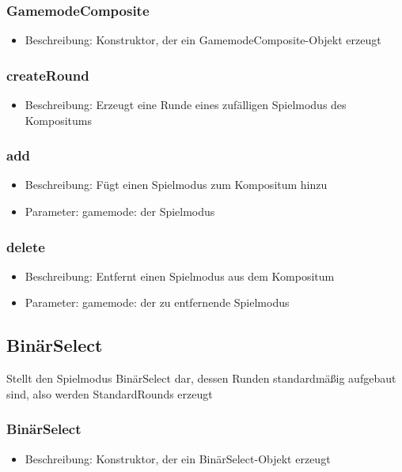 \documentclass[a4paper]{scrreprt}
\begin{document}
    \subsubsection{GamemodeComposite}
    \begin{itemize}
        \item Beschreibung: Konstruktor, der ein GamemodeComposite-Objekt erzeugt
    \end{itemize}
    \subsubsection{createRound}
    \begin{itemize}
        \item Beschreibung: Erzeugt eine Runde eines zufälligen Spielmodus des Kompositums
    \end{itemize}
    \subsubsection{add}
    \begin{itemize}
        \item Beschreibung: Fügt einen Spielmodus zum Kompositum hinzu
        \item Parameter: gamemode: der Spielmodus
    \end{itemize}
    \subsubsection{delete}
    \begin{itemize}
        \item Beschreibung: Entfernt einen Spielmodus aus dem Kompositum
        \item Parameter: gamemode: der zu entfernende Spielmodus
    \end{itemize}

    \subsection{BinärSelect}
    Stellt den Spielmodus BinärSelect dar, dessen Runden standardmäßig aufgebaut sind, also werden StandardRounds erzeugt
    \subsubsection{BinärSelect}
    \begin{itemize}
        \item Beschreibung: Konstruktor, der ein BinärSelect-Objekt erzeugt
    \end{itemize}
\end{document}
